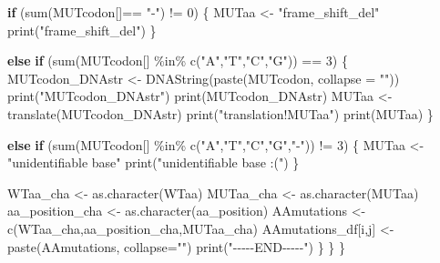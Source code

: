 \documentclass[
]{article}
\newenvironment{Shaded}{\begin{snugshade}}{\end{snugshade}}
\newcommand{\AttributeTok}[1]{\textcolor[rgb]{0.77,0.63,0.00}{#1}}
\newcommand{\ControlFlowTok}[1]{\textcolor[rgb]{0.13,0.29,0.53}{\textbf{#1}}}
\newcommand{\DecValTok}[1]{\textcolor[rgb]{0.00,0.00,0.81}{#1}}
\newcommand{\FunctionTok}[1]{\textcolor[rgb]{0.00,0.00,0.00}{#1}}
\newcommand{\NormalTok}[1]{#1}
\newcommand{\OtherTok}[1]{\textcolor[rgb]{0.56,0.35,0.01}{#1}}
\newcommand{\SpecialCharTok}[1]{\textcolor[rgb]{0.00,0.00,0.00}{#1}}
\newcommand{\StringTok}[1]{\textcolor[rgb]{0.31,0.60,0.02}{#1}}
\begin{document}
\begin{Shaded}
\begin{Highlighting}[]
      \ControlFlowTok{if}\NormalTok{ (}\FunctionTok{sum}\NormalTok{(MUTcodon[]}\SpecialCharTok{==} \StringTok{"{-}"}\NormalTok{) }\SpecialCharTok{!=} \DecValTok{0}\NormalTok{)}
\NormalTok{      \{}
\NormalTok{        MUTaa }\OtherTok{\textless{}{-}} \StringTok{"frame\_shift\_del"}
        \FunctionTok{print}\NormalTok{(}\StringTok{"frame\_shift\_del"}\NormalTok{)}
\NormalTok{      \}}
      
      
      \ControlFlowTok{else} \ControlFlowTok{if}\NormalTok{ (}\FunctionTok{sum}\NormalTok{(MUTcodon[] }\SpecialCharTok{\%in\%} \FunctionTok{c}\NormalTok{(}\StringTok{"A"}\NormalTok{,}\StringTok{"T"}\NormalTok{,}\StringTok{"C"}\NormalTok{,}\StringTok{"G"}\NormalTok{)) }\SpecialCharTok{==} \DecValTok{3}\NormalTok{)}
\NormalTok{      \{}
\NormalTok{        MUTcodon\_DNAstr }\OtherTok{\textless{}{-}} \FunctionTok{DNAString}\NormalTok{(}\FunctionTok{paste}\NormalTok{(MUTcodon, }\AttributeTok{collapse =} \StringTok{""}\NormalTok{))}
        \FunctionTok{print}\NormalTok{(}\StringTok{"MUTcodon\_DNAstr"}\NormalTok{)}
        \FunctionTok{print}\NormalTok{(MUTcodon\_DNAstr)}
\NormalTok{        MUTaa }\OtherTok{\textless{}{-}} \FunctionTok{translate}\NormalTok{(MUTcodon\_DNAstr)}
        \FunctionTok{print}\NormalTok{(}\StringTok{"translation!MUTaa"}\NormalTok{)}
        \FunctionTok{print}\NormalTok{(MUTaa)}
\NormalTok{      \}}
      
      \ControlFlowTok{else} \ControlFlowTok{if}\NormalTok{ (}\FunctionTok{sum}\NormalTok{(MUTcodon[] }\SpecialCharTok{\%in\%} \FunctionTok{c}\NormalTok{(}\StringTok{"A"}\NormalTok{,}\StringTok{"T"}\NormalTok{,}\StringTok{"C"}\NormalTok{,}\StringTok{"G"}\NormalTok{,}\StringTok{"{-}"}\NormalTok{)) }\SpecialCharTok{!=} \DecValTok{3}\NormalTok{)}
\NormalTok{      \{}
\NormalTok{        MUTaa }\OtherTok{\textless{}{-}} \StringTok{"unidentifiable base"}
        \FunctionTok{print}\NormalTok{(}\StringTok{"unidentifiable base :("}\NormalTok{)}
\NormalTok{      \}}
      
\NormalTok{      WTaa\_cha }\OtherTok{\textless{}{-}} \FunctionTok{as.character}\NormalTok{(WTaa)}
\NormalTok{      MUTaa\_cha }\OtherTok{\textless{}{-}} \FunctionTok{as.character}\NormalTok{(MUTaa)}
\NormalTok{      aa\_position\_cha }\OtherTok{\textless{}{-}} \FunctionTok{as.character}\NormalTok{(aa\_position)}
\NormalTok{      AAmutations }\OtherTok{\textless{}{-}} \FunctionTok{c}\NormalTok{(WTaa\_cha,aa\_position\_cha,MUTaa\_cha)}
\NormalTok{      AAmutations\_df[i,j] }\OtherTok{\textless{}{-}} \FunctionTok{paste}\NormalTok{(AAmutations, }\AttributeTok{collapse=}\StringTok{""}\NormalTok{)}
      \FunctionTok{print}\NormalTok{(}\StringTok{"{-}{-}{-}{-}{-}END{-}{-}{-}{-}{-}"}\NormalTok{)}
\NormalTok{    \}}
\NormalTok{  \}}
\NormalTok{\}}
\end{Highlighting}
\end{Shaded}
\end{document}
